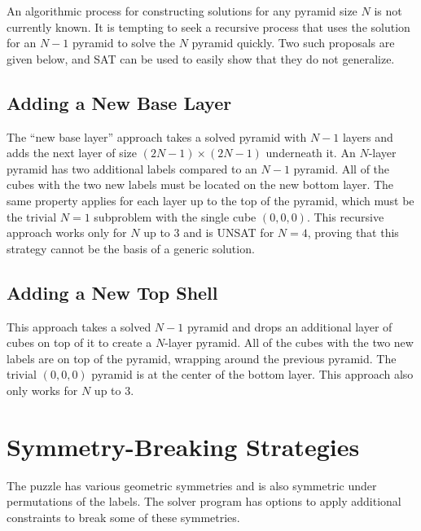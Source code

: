 \documentclass[conference]{IEEEtran}
\begin{document}
An algorithmic process for constructing solutions for any pyramid size $N$ is not currently known.
It is tempting to seek a recursive process that uses the solution for an $N-1$ pyramid to solve the $N$ pyramid quickly.
Two such proposals are given below, and SAT can be used to easily show that they do not generalize.

\subsection{Adding a New Base Layer}

The ``new base layer'' approach takes a solved pyramid with $N-1$ layers and adds the next layer of size $(2N-1)\times(2N-1)$ underneath it.
An $N$\nobreakdash-layer pyramid has two additional labels compared to an $N-1$ pyramid.
All of the cubes with the two new labels must be located on the new bottom layer.
The same property applies for each layer up to the top of the pyramid, which must be the trivial $N=1$ subproblem with the single cube $(0,0,0)$.
This recursive approach works only for $N$ up to 3 and is UNSAT for $N=4$, proving that this strategy cannot be the basis of a generic solution.

\subsection{Adding a New Top Shell}

This approach takes a solved $N-1$ pyramid and drops an additional layer of cubes on top of it to create a $N$\nobreakdash-layer pyramid.
All of the cubes with the two new labels are on top of the pyramid, wrapping around the previous pyramid.
The trivial $(0,0,0)$ pyramid is at the center of the bottom layer.
This approach also only works for $N$ up to 3.

\section{Symmetry-Breaking Strategies}

The puzzle has various geometric symmetries and is also symmetric under permutations of the labels.
The solver program has options to apply additional constraints to break some of these symmetries.
\end{document}
